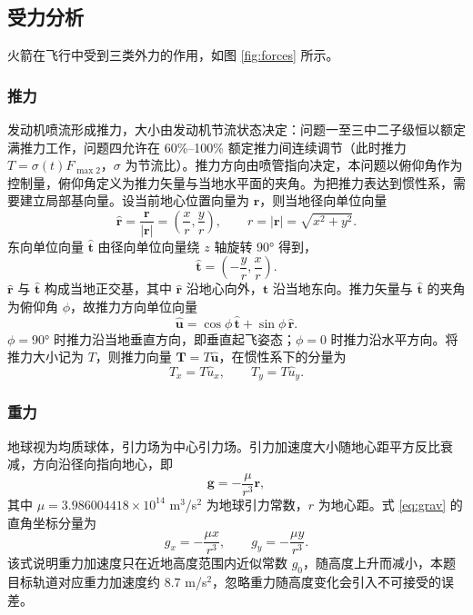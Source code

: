 \documentclass[withoutpreface,bwprint]{cumcmthesis}
\begin{document}
\subsection{受力分析}
火箭在飞行中受到三类外力的作用，如图 \ref{fig:forces} 所示。

\subsubsection{推力}
发动机喷流形成推力，大小由发动机节流状态决定：问题一至三中二子级恒以额定满推力工作，问题四允许在 60\%--100\% 额定推力间连续调节（此时推力 $T=\sigma(t)F_{\max2}$，$\sigma$ 为节流比）。推力方向由喷管指向决定，本问题以俯仰角作为控制量，俯仰角定义为推力矢量与当地水平面的夹角。为把推力表达到惯性系，需要建立局部基向量。设当前地心位置向量为 $\bm r$，则当地径向单位向量
\begin{equation}
\bm{\hat r}=\frac{\bm r}{|\bm r|}=\left(\frac{x}{r},\frac{y}{r}\right),\qquad r=|\bm r|=\sqrt{x^{2}+y^{2}}.
\label{eq:hatr}
\end{equation}
东向单位向量 $\bm{\hat t}$ 由径向单位向量绕 $z$ 轴旋转 $90°$ 得到，
\begin{equation}
\bm{\hat t}=\left(-\frac{y}{r},\frac{x}{r}\right).
\label{eq:hatt}
\end{equation}
$\bm{\hat r}$ 与 $\bm{\hat t}$ 构成当地正交基，其中 $\bm{\hat r}$ 沿地心向外，$\bm{\hat t}$ 沿当地东向。推力矢量与 $\bm{\hat t}$ 的夹角为俯仰角 $\phi$，故推力方向单位向量
\begin{equation}
\bm{\hat u}=\cos\phi\,\bm{\hat t}+\sin\phi\,\bm{\hat r}.
\label{eq:thrustdir}
\end{equation}
$\phi=90°$ 时推力沿当地垂直方向，即垂直起飞姿态；$\phi=0$ 时推力沿水平方向。将推力大小记为 $T$，则推力向量 $\bm T=T\bm{\hat u}$，在惯性系下的分量为
\begin{equation}
T_x=T\hat u_x,\qquad T_y=T\hat u_y.
\label{eq:thrustcomp}
\end{equation}

\subsubsection{重力}
地球视为均质球体，引力场为中心引力场。引力加速度大小随地心距平方反比衰减，方向沿径向指向地心，即
\begin{equation}
\bm g=-\frac{\mu}{r^{3}}\bm r,
\label{eq:grav}
\end{equation}
其中 $\mu=3.986004418\times10^{14}$ m$^3$/s$^2$ 为地球引力常数，$r$ 为地心距。式 \eqref{eq:grav} 的直角坐标分量为
\begin{equation}
g_x=-\frac{\mu x}{r^{3}},\qquad g_y=-\frac{\mu y}{r^{3}}.
\label{eq:gravcomp}
\end{equation}
该式说明重力加速度只在近地高度范围内近似常数 $g_0$，随高度上升而减小，本题目标轨道对应重力加速度约 8.7 m/s$^2$，忽略重力随高度变化会引入不可接受的误差。
\end{document}
